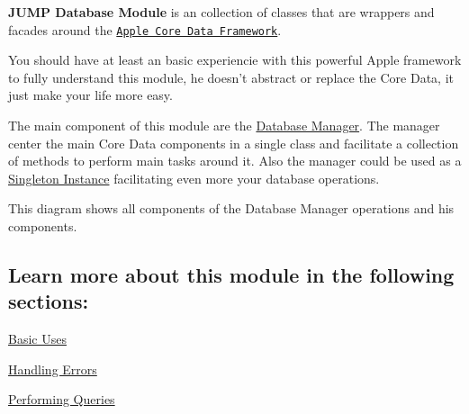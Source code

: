 {\bfseries JUMP Database Module} is an collection of classes that are wrappers and facades around the \href{http://developer.apple.com/library/mac/#documentation/cocoa/conceptual/CoreData/cdProgrammingGuide.html}{\tt Apple Core Data Framework}.\par
 \par
 You should have at least an basic experiencie with this powerful Apple framework to fully understand this module, he doesn't abstract or replace the Core Data, it just make your life more easy.\par
 \par
 The main component of this module are the \hyperlink{interface_j_p_d_b_manager}{Database Manager}. The manager center the main Core Data components in a single class and facilitate a collection of methods to perform main tasks around it. Also the manager could be used as a \hyperlink{interface_j_p_d_b_manager_singleton}{Singleton Instance} facilitating even more your database operations.

This diagram shows all components of the Database Manager operations and his components.\par
 \par
 

\subsection*{Learn more about this module in the following sections:}


\begin{DoxyItemize}
\item \hyperlink{basic_uses}{Basic Uses}
\item \hyperlink{errors}{Handling Errors}
\item \hyperlink{queries}{Performing Queries} 
\end{DoxyItemize}